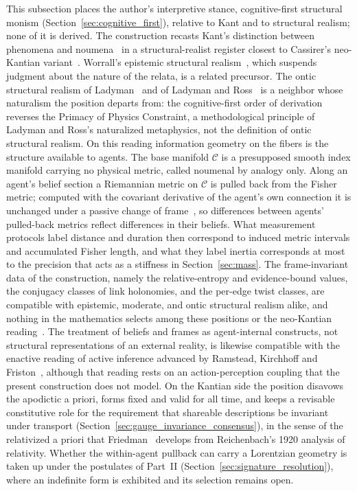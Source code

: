 \documentclass[11pt]{article}
\begin{document}
This subsection places the author's interpretive stance, cognitive-first structural monism (Section~\ref{sec:cognitive_first}), relative to Kant and to structural realism; none of it is derived. The construction recasts Kant's distinction between phenomena and noumena~\cite{Kant1781} in a structural-realist register closest to Cassirer's neo-Kantian variant~\cite{Cassirer1923}. Worrall's epistemic structural realism~\cite{Worrall1989}, which suspends judgment about the nature of the relata, is a related precursor. The ontic structural realism of Ladyman~\cite{Ladyman1998} and of Ladyman and Ross~\cite{Ladyman2007} is a neighbor whose naturalism the position departs from: the cognitive-first order of derivation reverses the Primacy of Physics Constraint, a methodological principle of Ladyman and Ross's naturalized metaphysics, not the definition of ontic structural realism. On this reading information geometry on the fibers is the structure available to agents. The base manifold $\mathcal{C}$ is a presupposed smooth index manifold carrying no physical metric, called noumenal by analogy only. Along an agent's belief section a Riemannian metric on $\mathcal{C}$ is pulled back from the Fisher metric; computed with the covariant derivative of the agent's own connection it is unchanged under a passive change of frame~\cite[Ch.~B2]{DennisGaugeVFESuppB2026}, so differences between agents' pulled-back metrics reflect differences in their beliefs. What measurement protocols label distance and duration then correspond to induced metric intervals and accumulated Fisher length, and what they label inertia corresponds at most to the precision that acts as a stiffness in Section~\ref{sec:mass}. The frame-invariant data of the construction, namely the relative-entropy and evidence-bound values, the conjugacy classes of link holonomies, and the per-edge twist classes, are compatible with epistemic, moderate, and ontic structural realism alike, and nothing in the mathematics selects among these positions or the neo-Kantian reading~\cite[Ch.~14]{DennisGaugeVFE2026}. The treatment of beliefs and frames as agent-internal constructs, not structural representations of an external reality, is likewise compatible with the enactive reading of active inference advanced by Ramstead, Kirchhoff and Friston~\cite{Ramstead2019}, although that reading rests on an action-perception coupling that the present construction does not model. On the Kantian side the position disavows the apodictic a priori, forms fixed and valid for all time, and keeps a revisable constitutive role for the requirement that shareable descriptions be invariant under transport (Section~\ref{sec:gauge_invariance_consensus}), in the sense of the relativized a priori that Friedman~\cite{Friedman2001} develops from Reichenbach's 1920 analysis of relativity. Whether the within-agent pullback can carry a Lorentzian geometry is taken up under the postulates of Part~II (Section~\ref{sec:signature_resolution}), where an indefinite form is exhibited and its selection remains open.
\end{document}
